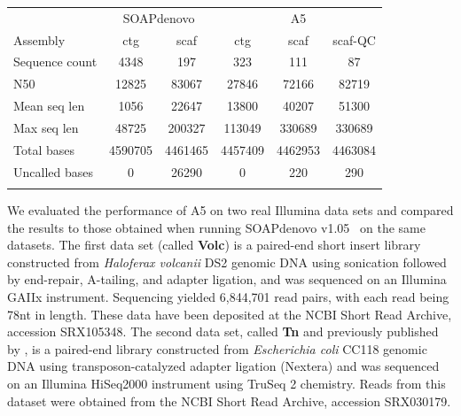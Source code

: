 \documentclass{bioinfo}
\begin{document}

\begin{table}[!t]
{\begin{tabular}{l|cc|ccc}\toprule
& \multicolumn{2}{c|}{SOAPdenovo} & \multicolumn{3}{c}{A5} \\
Assembly        & ctg     & scaf    & ctg     & scaf    & scaf-QC \\\midrule
Sequence count  & 4348    & 197     & 323     & 111     & 87      \\
N50             & 12825   & 83067   & 27846   & 72166   & 82719   \\
Mean seq len    & 1056    & 22647   & 13800   & 40207   & 51300   \\
Max seq len     & 48725   & 200327  & 113049  & 330689  & 330689  \\
Total bases     & 4590705 & 4461465 & 4457409 & 4462953 & 4463084 \\
Uncalled bases  & 0       & 26290   & 0       & 220     & 290     \\
\botrule \\
\end{tabular}}{}
\end{table}

We evaluated the performance of A5 on two real Illumina data sets and compared the results to
those obtained when running SOAPdenovo v1.05~\citep{Li2010} on the same datasets. The first data set (called \textbf{Volc}) is a paired-end short insert library constructed from \emph{Haloferax volcanii} DS2 genomic DNA 
using sonication followed by end-repair, A-tailing, and adapter ligation, and was sequenced on an Illumina GAIIx instrument.
Sequencing yielded 6,844,701 read pairs, with each read being 78nt in length. These data have been deposited at the NCBI Short Read Archive, accession SRX105348. 
The second data set, called \textbf{Tn} and previously published by \citet{Adey2010}, is a paired-end library constructed from \emph{Escherichia coli} CC118 genomic DNA
using transposon-catalyzed adapter ligation (Nextera) and was sequenced on an Illumina HiSeq2000 instrument using TruSeq 2 chemistry. 
Reads from this dataset were obtained from the NCBI Short Read Archive, accession SRX030179.
\end{document}
